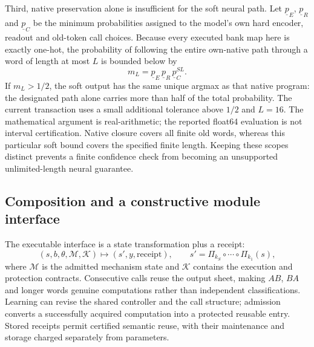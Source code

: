 Third, native preservation alone is insufficient for the soft neural path.
Let $\underline p_E$, $\underline p_R$ and $\underline p_C$ be the minimum
probabilities assigned to the model's own hard encoder, readout and old-token
call choices. Because every executed bank map here is exactly one-hot, the
probability of following the entire own-native path through a word of length
at most $L$ is bounded below by
\begin{equation}
 m_L=\underline p_E\,\underline p_R\,
                 \underline p_C^{SL}.
 \label{eq:block-soft-native-mass}
\end{equation}
If $m_L>1/2$, the soft output has the same unique argmax as that native
program: the designated path alone carries more than half of the total
probability. The current transaction uses a small additional tolerance above
$1/2$ and $L=16$. The mathematical argument is real-arithmetic; the reported
float64 evaluation is not interval certification. Native closure covers all
finite old words, whereas this particular soft bound covers the specified
finite length. Keeping these scopes distinct prevents a finite confidence
check from becoming an unsupported unlimited-length neural guarantee.

\subsection{Composition and a constructive module interface}

The executable interface is a state transformation plus a receipt:
\begin{equation}
 (s,b,\theta,\mathcal M,\mathcal K)
 \longmapsto (s',y,\mathrm{receipt}),
 \qquad
 s'=\Pi_{k_S}\circ\cdots\circ\Pi_{k_1}(s),
 \label{eq:block-interface}
\end{equation}
where $\mathcal M$ is the admitted mechanism state and $\mathcal K$ contains
the execution and protection contracts. Consecutive calls reuse the output
sheet, making $AB$, $BA$ and longer words genuine computations rather than
independent classifications. Learning can revise the shared controller and
the call structure; admission converts a successfully acquired computation
into a protected reusable entry. Stored receipts permit certified semantic
reuse, with their maintenance and storage charged separately from parameters.

